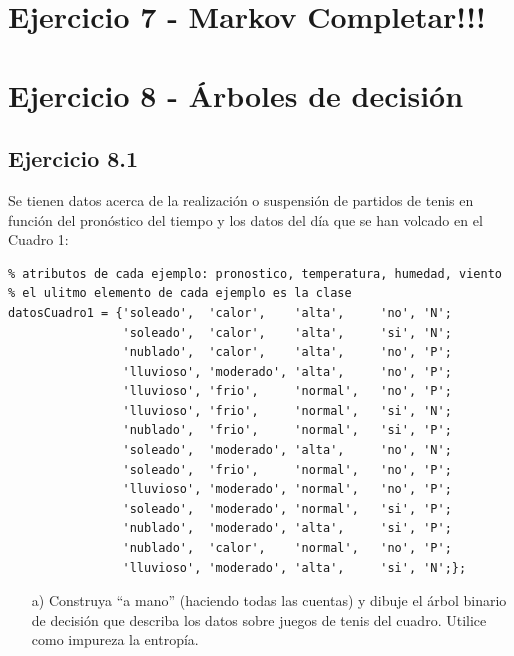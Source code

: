 \documentclass[11pt,a4paper,final]{article}
\begin{document}
\clearpage






\section{Ejercicio 7 - Markov Completar!!!}





\clearpage


\section{Ejercicio 8 - Árboles de decisión}


\subsection{Ejercicio 8.1}

Se tienen datos acerca de la realización o suspensión de partidos de tenis en función del pronóstico del tiempo y los datos del día que se han volcado en el Cuadro 1:

\begin{verbatim}
% atributos de cada ejemplo: pronostico, temperatura, humedad, viento
% el ulitmo elemento de cada ejemplo es la clase
datosCuadro1 = {'soleado',  'calor',    'alta',     'no', 'N';
                'soleado',  'calor',    'alta',     'si', 'N';
                'nublado',  'calor',    'alta',     'no', 'P';
                'lluvioso', 'moderado', 'alta',     'no', 'P';
                'lluvioso', 'frio',     'normal',   'no', 'P';
                'lluvioso', 'frio',     'normal',   'si', 'N';
                'nublado',  'frio',     'normal',   'si', 'P';
                'soleado',  'moderado', 'alta',     'no', 'N';
                'soleado',  'frio',     'normal',   'no', 'P';
                'lluvioso', 'moderado', 'normal',   'no', 'P';
                'soleado',  'moderado', 'normal',   'si', 'P';
                'nublado',  'moderado', 'alta',     'si', 'P';
                'nublado',  'calor',    'normal',   'no', 'P';
                'lluvioso', 'moderado', 'alta',     'si', 'N';};
\end{verbatim}

\begin{itemize}
   \item[a)] Construya ``a mano'' (haciendo todas las cuentas) y dibuje el árbol binario de decisión que describa los datos sobre juegos de tenis del cuadro. Utilice como impureza la entropía.
\end{itemize}
\end{document}
